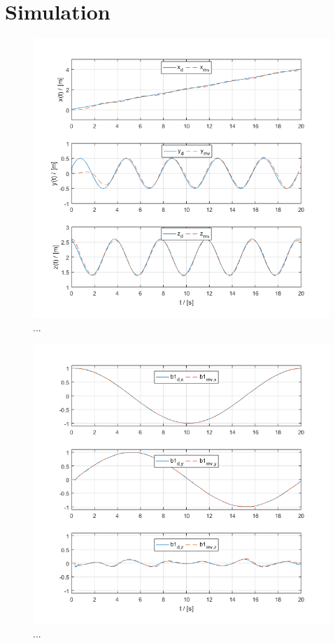 \section{Simulation}


\begin{figure}[h!]
	\centering
	\includegraphics[width=\columnwidth]{./pictures/mmc_traj_pos.png}
	\caption{...}
	\label{fig:traj_pos}
\end{figure}


\begin{figure}[h!]
	\centering
	\includegraphics[width=\columnwidth]{./pictures/mmc_traj_b1d.png}
	\caption{...}
	\label{fig:traj_b1d}
\end{figure}

